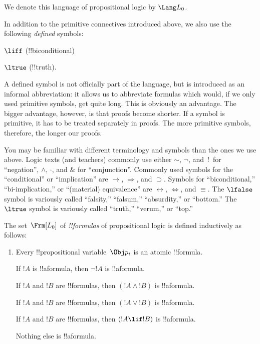 We denote this language of propositional logic by $\Lang L_0$.


In addition to the primitive connectives introduced
above, we also use the following \emph{defined} symbols:
\startycommalist
  
  
  
  
  \ycomma $\liff$ (!!{biconditional})
  
  \ycomma $\ltrue$ (!!{truth}).


\begin{explain}
A defined symbol is not officially part of the language, but is
introduced as an informal abbreviation: it allows us to abbreviate
formulas which would, if we only used primitive symbols, get quite
long.  This is obviously an advantage.  The bigger advantage, however,
is that proofs become shorter.  If a symbol is primitive, it has to be
treated separately in proofs. The more primitive symbols, therefore,
the longer our proofs.
\end{explain}




\begin{intro}
You may be familiar with different terminology and symbols than the
ones we use above. Logic texts (and teachers) commonly use either
$\sim$, $\neg$, and~!\ for ``negation'', $\wedge$, $\cdot$, and $\&$
for ``conjunction''.  Commonly used symbols for the ``conditional'' or
``implication'' are $\rightarrow$, $\Rightarrow$, and $\supset$.
Symbols for ``biconditional,'' ``bi-implication,''
  or ``(material) equivalence'' are $\leftrightarrow$,
  $\Leftrightarrow$, and $\equiv$.
The $\lfalse$ symbol is variously called
  ``falsity,'' ``falsum,'' ``absurdity,'' or ``bottom.''
The $\ltrue$ symbol is variously called
  ``truth,'' ``verum,'' or ``top.''
\end{intro}

\begin{defn}[Formula]
The set~$\Frm[L_0]$ of \emph{!!{formula}s} of propositional logic
is defined inductively as follows:
\begin{enumerate}
$\lfalse$ is an atomic !!{formula}.



\item Every !!{propositional variable}~$\Obj p_i$ is an atomic
  !!{formula}.

If $!A$ is !!a{formula}, then $\lnot !A$ is
  !!a{formula}.

If $!A$ and $!B$ are !!{formula}s, then $(!A \land
  !B)$ is !!a{formula}.

If $!A$ and $!B$ are !!{formula}s, then $(!A \lor !B)$
  is !!a{formula}.

If $!A$ and $!B$ are !!{formula}s, then $(!A \lif !B)$
  is !!a{formula}.



Nothing else is !!a{formula}.
\end{enumerate}
\end{defn}

